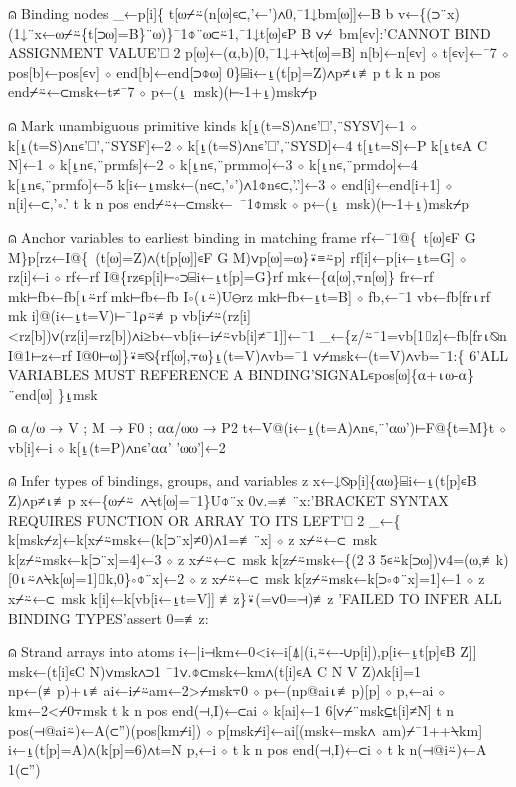 \documentclass{article}%
\begin{document}
⍝ Binding nodes
         _←p[i]\{
                 t[⍵⌿⍨(n[⍵]∊⊂,'←')∧0,¯1↓bm[⍵]]←B
                 b v←\{(⊃¨x)(1↓¨x←⍵⌿⍨\{t[⊃⍵]=B\}¨⍵)\}¯1⌽¨⍵⊂⍨1,¯1↓t[⍵]∊P B
                 ∨⌿~bm[∊v]:'CANNOT BIND ASSIGNMENT VALUE'⎕ 2
                 p[⍵]←(⍺,b)[0,¯1↓+⍀t[⍵]=B]
                 n[b]←n[∊v] ⋄ t[∊v]←¯7 ⋄ pos[b]←pos[∊v] ⋄ end[b]←end[⊃⌽⍵]
         0\}⌸i←⍸(t[p]=Z)∧p≠⍳≢p
         t k n pos end⌿⍨←⊂msk←t≠¯7 ⋄ p←(⍸~msk)(⊢-1+⍸)msk⌿p

⍝ Mark unambiguous primitive kinds
         k[⍸(t=S)∧n∊'⎕',¨SYSV]←1 ⋄ k[⍸(t=S)∧n∊'⎕',¨SYSF]←2 ⋄ k[⍸(t=S)∧n∊'⎕',¨SYSD]←4
         t[⍸t=S]←P
         k[⍸t∊A C N]←1 ⋄ k[⍸n∊,¨prmfs]←2 ⋄ k[⍸n∊,¨prmmo]←3 ⋄ k[⍸n∊,¨prmdo]←4
         k[⍸n∊,¨prmfo]←5
         k[i←⍸msk←(n∊⊂,'∘')∧1⌽n∊⊂,'.']←3 ⋄ end[i]←end[i+1] ⋄ n[i]←⊂,'∘.'
         t k n pos end⌿⍨←⊂msk←~¯1⌽msk ⋄ p←(⍸~msk)(⊢-1+⍸)msk⌿p

⍝ Anchor variables to earliest binding in matching frame
         rf←¯1@\{~t[⍵]∊F G M\}p[rz←I@\{~(t[⍵]=Z)∧(t[p[⍵]]∊F G M)∨p[⍵]=⍵\}⍣≡⍨p]
         rf[i]←p[i←⍸t=G] ⋄ rz[i]←i ⋄ rf←rf I@\{rz∊p[i]⊢∘⊃⌸i←⍸t[p]=G\}rf
         mk←\{⍺[⍵],⍪n[⍵]\}
         fr←rf mk⊢fb←fb[⍳⍨rf mk⊢fb←fb I∘(⍳⍨)U⊖rz mk⊢fb←⍸t=B] ⋄ fb,←¯1
         vb←fb[fr⍳rf mk i]@(i←⍸t=V)⊢¯1⍴⍨≢p
         vb[i⌿⍨(rz[i]<rz[b])∨(rz[i]=rz[b])∧i≥b←vb[i←i⌿⍨vb[i]≠¯1]]←¯1
         _←\{z/⍨¯1=vb[1⌷z]←fb[fr⍳⍉n I@1⊢z←rf I@0⊢⍵]\}⍣≡⍉\{rf[⍵],⍪⍵\}⍸(t=V)∧vb=¯1
         ∨⌿msk←(t=V)∧vb=¯1:\{
                 6'ALL VARIABLES MUST REFERENCE A BINDING'SIGNAL∊pos[⍵]\{⍺+⍳⍵-⍺\}¨end[⍵]
         \}⍸msk

⍝ ⍺/⍵ → V ; M → F0 ; ⍺⍺/⍵⍵ → P2
         t←V@(i←⍸(t=A)∧n∊,¨'⍺⍵')⊢F@\{t=M\}t ⋄ vb[i]←i ⋄ k[⍸(t=P)∧n∊'⍺⍺' '⍵⍵']←2

⍝ Infer types of bindings, groups, and variables
         z x←↓⍉p[i]\{⍺⍵\}⌸i←⍸(t[p]∊B Z)∧p≠⍳≢p
         x←\{⍵⌿⍨~∧⍀t[⍵]=¯1\}U⌽¨x
         0∨.=≢¨x:'BRACKET SYNTAX REQUIRES FUNCTION OR ARRAY TO ITS LEFT'⎕ 2
         _←\{
                 k[msk⌿z]←k[x⌿⍨msk←(k[⊃¨x]≠0)∧1=≢¨x] ⋄ z x⌿⍨←⊂~msk
                 k[z⌿⍨msk←k[⊃¨x]=4]←3 ⋄ z x⌿⍨←⊂~msk
                 k[z⌿⍨msk←\{(2 3 5∊⍨k[⊃⍵])∨4=(⍵,≢k)[0⍳⍨∧⍀k[⍵]=1]⌷k,0\}∘⌽¨x]←2 ⋄ z x⌿⍨←⊂~msk
                 k[z⌿⍨msk←k[⊃∘⌽¨x]=1]←1 ⋄ z x⌿⍨←⊂~msk
                 k[i]←k[vb[i←⍸t=V]]
         ≢z\}⍣(=∨0=⊣)≢z
         'FAILED TO INFER ALL BINDING TYPES'assert 0=≢z:

⍝ Strand arrays into atoms
         i←|i⊣km←0<i←i[⍋|(i,⍨←-∪p[i]),p[i←⍸t[p]∊B Z]]
         msk←(t[i]∊C N)∨msk∧⊃1 ¯1∨.⌽⊂msk←km∧(t[i]∊A C N V Z)∧k[i]=1
         np←(≢p)+⍳≢ai←i⌿⍨am←2>⌿msk⍪0 ⋄ p←(np@ai⍳≢p)[p] ⋄ p,←ai ⋄ km←2<⌿0⍪msk
         t k n pos end(⊣,I)←⊂ai ⋄ k[ai]←1 6[∨⌿¨msk⊆t[i]≠N]
         t n pos(⊣@ai⍨)←A(⊂'')(pos[km⌿i]) ⋄ p[msk⌿i]←ai[(msk←msk∧~am)⌿¯1++⍀km]
         i←⍸(t[p]=A)∧(k[p]=6)∧t=N
         p,←i ⋄ t k n pos end(⊣,I)←⊂i ⋄ t k n(⊣@i⍨)←A 1(⊂'')
\end{document}
